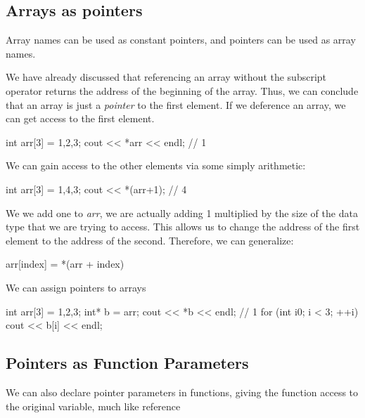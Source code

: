 \documentclass{report}
\begin{document}
    \pagebreak\bigbreak \noindent 
    \subsection{Arrays as pointers}
    \bigbreak \noindent 
    \begin{concept}
 Array names can be used as constant pointers, and pointers can be used as array names.
	\end{concept}
    \bigbreak \noindent 
    We have already discussed that referencing an array without the subscript operator returns the address of the beginning of the array. Thus, we can conclude that an array is just a \textit{pointer} to the first element.
    \bigbreak \noindent 
    If we deference an array, we can get access to the first element.
    \bigbreak \noindent 
    
    \begin{cppcode}
int arr[3] = {1,2,3};
cout << *arr << endl; // 1
    \end{cppcode}
    
    \bigbreak \noindent 
    We can gain access to the other elements via some simply arithmetic:
    \bigbreak \noindent 
    
    \begin{cppcode}
int arr[3] = {1,4,3};
cout << *(arr+1); // 4
    \end{cppcode}
    
    \bigbreak \noindent 
    We we add one to \textit{arr}, we are actually adding 1 multiplied by the size of the data type that we are trying to access. This allows us to change the address of the first element to the address of the second.
    \bigbreak \noindent 
    Therefore, we can generalize:
    \bigbreak \noindent 
    
    \begin{cppcode}
arr[index] = *(arr + index)
    \end{cppcode}
    

    \bigbreak \noindent 
    We can assign pointers to arrays
    \bigbreak \noindent 
    
    \begin{cppcode}
int arr[3] = {1,2,3};
int* b = arr;
cout << *b << endl; // 1
for (int i{0}; i < 3; ++i) {
    cout << b[i] << endl;
}
    \end{cppcode}
    

    \pagebreak \bigbreak \noindent 
    \subsection{Pointers as Function Parameters}
    \bigbreak \noindent 
    We can also declare pointer parameters in functions, giving the function access to the original variable, much like reference
    \bigbreak \noindent 
    
\end{document}
